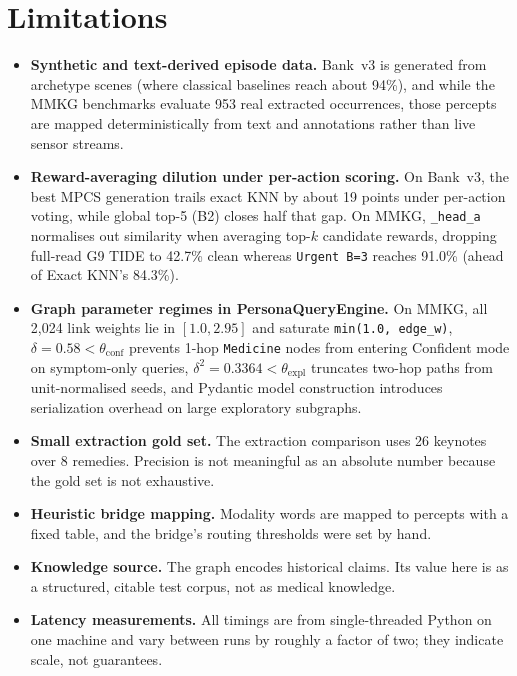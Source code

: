 \documentclass[12pt,a4paper,oneside]{report}
\newcommand{\code}[1]{\texttt{\small #1}}
\begin{document}
\section{Limitations}
\begin{itemize}
  \item \textbf{Synthetic and text-derived episode data.} Bank~v3 is generated from archetype scenes (where classical baselines reach about 94\%), and while the MMKG benchmarks evaluate 953 real extracted occurrences, those percepts are mapped deterministically from text and annotations rather than live sensor streams.
  \item \textbf{Reward-averaging dilution under per-action scoring.} On Bank~v3, the best MPCS generation trails exact KNN by about 19 points under per-action voting, while global top-5 (B2) closes half that gap. On MMKG, \code{\_head\_a} normalises out similarity when averaging top-$k$ candidate rewards, dropping full-read G9 TIDE to 42.7\% clean whereas \code{Urgent B=3} reaches 91.0\% (ahead of Exact KNN's 84.3\%).
  \item \textbf{Graph parameter regimes in PersonaQueryEngine.} On MMKG, all 2,024 link weights lie in $[1.0, 2.95]$ and saturate \code{min(1.0, edge\_w)}, $\delta = 0.58 < \theta_{\text{conf}}$ prevents 1-hop \code{Medicine} nodes from entering Confident mode on symptom-only queries, $\delta^2 = 0.3364 < \theta_{\text{expl}}$ truncates two-hop paths from unit-normalised seeds, and Pydantic model construction introduces serialization overhead on large exploratory subgraphs.
  \item \textbf{Small extraction gold set.} The extraction comparison uses 26 keynotes over 8 remedies. Precision is not meaningful as an absolute number because the gold set is not exhaustive.
  \item \textbf{Heuristic bridge mapping.} Modality words are mapped to percepts with a fixed table, and the bridge's routing thresholds were set by hand.
  \item \textbf{Knowledge source.} The graph encodes historical claims. Its value here is as a structured, citable test corpus, not as medical knowledge.
  \item \textbf{Latency measurements.} All timings are from single-threaded Python on one machine and vary between runs by roughly a factor of two; they indicate scale, not guarantees.
\end{itemize}
\end{document}
